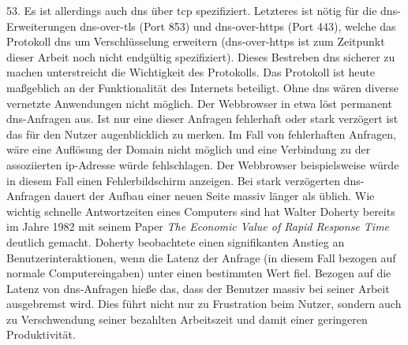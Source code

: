 \documentclass[titlepage]{report}
\begin{document}
53\cite[Siehe Section 4.2.1]{RFC1035}. Es ist allerdings auch \gls{dns}
über \gls{tcp} spezifiziert\cite[Siehe Section 4.2.2]{RFC1035}.
Letzteres ist nötig für die \gls{dns}\hyp{}Erweiterungen
\gls{dns}\hyp{}over\hyp{}\gls{tls} (Port 853) und
\gls{dns}\hyp{}over\hyp{}\gls{https} (Port 443), welche das Protokoll \gls{dns} um
Verschlüsselung erweitern\cite{RFC7858}
(\gls{dns}\hyp{}over\hyp{}\gls{https} ist zum Zeitpunkt dieser Arbeit
noch nicht endgültig spezifiziert). Dieses Bestreben \gls{dns} sicherer
zu machen unterstreicht die Wichtigkeit des Protokolls. Das Protokoll
ist heute maßgeblich an der Funktionalität des Internets beteiligt. Ohne
\gls{dns} wären diverse vernetzte Anwendungen nicht möglich. Der
Webbrowser in etwa löst permanent \gls{dns}\hyp{}Anfragen aus. Ist nur
eine dieser Anfragen fehlerhaft oder stark verzögert ist das für den
Nutzer augenblicklich zu merken. Im Fall von fehlerhaften Anfragen, wäre
eine Auflösung der Domain nicht möglich und eine Verbindung zu der
assoziierten \gls{ip}\hyp{}Adresse würde fehlschlagen. Der Webbrowser
beispielsweise würde in diesem Fall einen Fehlerbildschirm anzeigen.
Bei stark verzögerten
\gls{dns}\hyp{}Anfragen dauert der Aufbau einer neuen Seite massiv
länger als üblich. Wie wichtig schnelle Antwortzeiten eines Computers
sind hat Walter Doherty bereits im Jahre 1982 mit seinem Paper \emph{The
Economic Value of Rapid Response Time} deutlich gemacht. Doherty
beobachtete einen signifikanten Anstieg an Benutzerinteraktionen, wenn
die Latenz der Anfrage (in diesem Fall bezogen auf normale
Computereingaben) unter einen bestimmten Wert fiel\cite{DOHERTY}.
Bezogen auf die Latenz von \gls{dns}\hyp{}Anfragen hieße das, dass der
Benutzer massiv bei seiner Arbeit ausgebremst wird. Dies führt nicht nur
zu Frustration beim Nutzer, sondern auch zu Verschwendung seiner
bezahlten Arbeitszeit und damit einer geringeren Produktivität.
\end{document}
